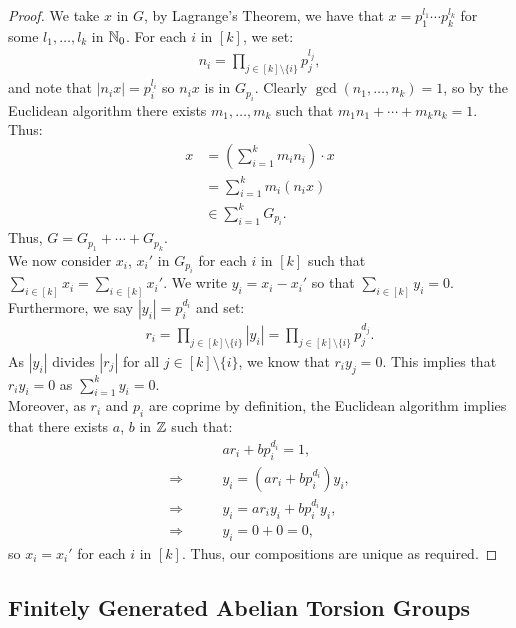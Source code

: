 \begin{proof}
    We take $x$ in $G$, by Lagrange's Theorem, we have that
    $x = p_1^{l_1} \cdots p_k^{l_k}$ for some $l_1, \ldots, l_k$ in $\mathbb{N}_0$.
    For each $i$ in $[k]$, we set: \begin{align*}
        n_i = \prod_{j \in [k]\setminus\{i\}} p_j^{l_j},
    \end{align*} and note that $|n_ix| = p_i^{l_i}$ so $n_ix$ is in $G_{p_i}$.
    Clearly $\gcd(n_1, \ldots, n_k) = 1$, so by the Euclidean algorithm there
    exists $m_1, \ldots, m_k$ such that $m_1n_1 + \cdots + m_kn_k = 1$. Thus:
    \begin{align*}
        x 
        &= \left(\sum_{i = 1}^k m_in_i\right) \cdot x \\
        &= \sum_{i = 1}^k m_i(n_ix) \\
        &\in \sum_{i = 1}^k G_{p_i}. 
    \end{align*} Thus, $G = G_{p_1} + \cdots + G_{p_k}$.
    \\[\baselineskip]
    We now consider $x_i$, $x_i'$ in $G_{p_i}$ for each $i$ in $[k]$ such
    that $\sum_{i \in [k]} x_i = \sum_{i \in [k]} x_i'$. We write
    $y_i = x_i - x_i'$ so that $\sum_{i \in [k]} y_i = 0$. Furthermore,
    we say $|y_i| = p_i^{d_i}$ and set: \begin{align*}
        r_i 
        = \prod_{j \in [k] \setminus \{i\}} |y_i|
        = \prod_{j \in [k] \setminus \{i\}} p_j^{d_j}.
    \end{align*} As $|y_i|$ divides $|r_j|$ for all 
    $j \in [k] \setminus \{i\}$, we know that $r_iy_j = 0$.
    This implies that $r_iy_i = 0$ as $\sum_{i = 1}^k y_i = 0$.
    \\[\baselineskip]
    Moreover, as $r_i$ and $p_i$ are coprime by definition, the
    Euclidean algorithm implies that there exists $a$, $b$ in $\mathbb{Z}$
    such that: \begin{align*}
        &ar_i + bp_i^{d_i} = 1, \\
        \Longrightarrow \qquad & y_i = (ar_i + bp_i^{d_i})y_i,  \\
        \Longrightarrow \qquad & y_i = ar_iy_i + bp_i^{d_i}y_i,  \\
        \Longrightarrow \qquad & y_i = 0 + 0 = 0, 
    \end{align*} so $x_i = x_i'$ for each $i$ in $[k]$. Thus, our
    compositions are unique as required.
\end{proof}

\subsection{Finitely Generated Abelian Torsion Groups}

